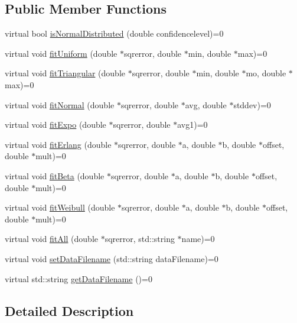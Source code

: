 \subsection*{Public Member Functions}
\begin{DoxyCompactItemize}
\item 
virtual bool \hyperlink{class_fitter__if_a53e98635fcdee314e8ade8089f41ddad}{is\-Normal\-Distributed} (double confidencelevel)=0
\item 
virtual void \hyperlink{class_fitter__if_adec53dfede4bdb31b175e57e6a2c2fc7}{fit\-Uniform} (double $\ast$sqrerror, double $\ast$min, double $\ast$max)=0
\item 
virtual void \hyperlink{class_fitter__if_a2bfc41c6a8044520aeafb2c5c71fe570}{fit\-Triangular} (double $\ast$sqrerror, double $\ast$min, double $\ast$mo, double $\ast$max)=0
\item 
virtual void \hyperlink{class_fitter__if_af95b4de00b7ed5d67b10d9ee458379bf}{fit\-Normal} (double $\ast$sqrerror, double $\ast$avg, double $\ast$stddev)=0
\item 
virtual void \hyperlink{class_fitter__if_a5ab5ac575b736bb720e6a40b334de5a3}{fit\-Expo} (double $\ast$sqrerror, double $\ast$avg1)=0
\item 
virtual void \hyperlink{class_fitter__if_aa46a5cd2d50d3cab34a719099e1058a1}{fit\-Erlang} (double $\ast$sqrerror, double $\ast$a, double $\ast$b, double $\ast$offset, double $\ast$mult)=0
\item 
virtual void \hyperlink{class_fitter__if_a686a7d540919b2e604df93b3049562d1}{fit\-Beta} (double $\ast$sqrerror, double $\ast$a, double $\ast$b, double $\ast$offset, double $\ast$mult)=0
\item 
virtual void \hyperlink{class_fitter__if_ae46e4cbb4354d6d06167aa498855d7ea}{fit\-Weibull} (double $\ast$sqrerror, double $\ast$a, double $\ast$b, double $\ast$offset, double $\ast$mult)=0
\item 
virtual void \hyperlink{class_fitter__if_a819a5ca8715ba4be30d2c7a3957aa467}{fit\-All} (double $\ast$sqrerror, std\-::string $\ast$name)=0
\item 
virtual void \hyperlink{class_fitter__if_aa2d2f13548a09a2f727a4190a6b9c2dd}{set\-Data\-Filename} (std\-::string data\-Filename)=0
\item 
virtual std\-::string \hyperlink{class_fitter__if_a3c6926020b1224a960890fe308abcc86}{get\-Data\-Filename} ()=0
\end{DoxyCompactItemize}


\subsection{Detailed Description}



